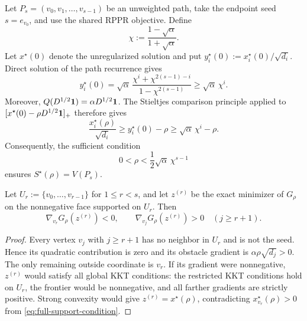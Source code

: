 \documentclass[11pt]{article}
\begin{document}
Let $P_s=(v_0,v_1,\ldots,v_{s-1})$ be an unweighted path, take the endpoint
seed $s=e_{v_0}$, and use the shared RPPR objective.  Define
\begin{equation}
 \chi:=\frac{1-\sqrt\alpha}{1+\sqrt\alpha}.
 \label{eq:chi}
\end{equation}
Let $x^\star(0)$ denote the unregularized solution and put
$y_i^\star(0):=x_i^\star(0)/\sqrt{d_i}$.  Direct solution of the path
recurrence gives
\begin{equation}
 y_i^\star(0)
 =\sqrt\alpha\,
   \frac{\chi^i+\chi^{2(s-1)-i}}{1-\chi^{2(s-1)}}
 \geq\sqrt\alpha\,\chi^i.
 \label{eq:path-green}
\end{equation}
Moreover, $Q(D^{1/2}\mathbf{1})=\alpha D^{1/2}\mathbf{1}$.  The Stieltjes comparison
principle applied to
$[x^\star(0)-\rho D^{1/2}\mathbf{1}]_+$ therefore gives
\begin{equation}
 \frac{x_i^\star(\rho)}{\sqrt{d_i}}
 \geq y_i^\star(0)-\rho
 \geq \sqrt\alpha\,\chi^i-\rho.
 \label{eq:path-positive-lower}
\end{equation}
Consequently, the sufficient condition
\begin{equation}
 0<\rho<\frac12\sqrt\alpha\,\chi^{s-1}
 \label{eq:full-support-condition}
\end{equation}
ensures $S^\star(\rho)=V(P_s)$.

\begin{lemma}
\label{lem:unique-frontier}
Let $U_r:=\{v_0,\ldots,v_{r-1}\}$ for $1\leq r<s$, and let $z^{(r)}$ be the
exact minimizer of $G_\rho$ on the nonnegative face supported on $U_r$.
Then
\begin{equation}
 \nabla_{v_r}G_\rho(z^{(r)})<0,
 \qquad
 \nabla_{v_j}G_\rho(z^{(r)})>0\quad(j\geq r+1).
 \label{eq:unique-frontier}
\end{equation}
\end{lemma}

\begin{proof}
Every vertex $v_j$ with $j\geq r+1$ has no neighbor in $U_r$ and is not the
seed.  Hence its quadratic contribution is zero and its obstacle gradient is
$\alpha\rho\sqrt{d_j}>0$.  The only remaining outside coordinate is $v_r$.
If its gradient were nonnegative, $z^{(r)}$ would satisfy all global KKT
conditions: the restricted KKT conditions hold on $U_r$, the frontier would
be nonnegative, and all farther gradients are strictly positive.  Strong
convexity would give $z^{(r)}=x^\star(\rho)$, contradicting
$x_{v_r}^\star(\rho)>0$ from \cref{eq:full-support-condition}.
\end{proof}
\end{document}
